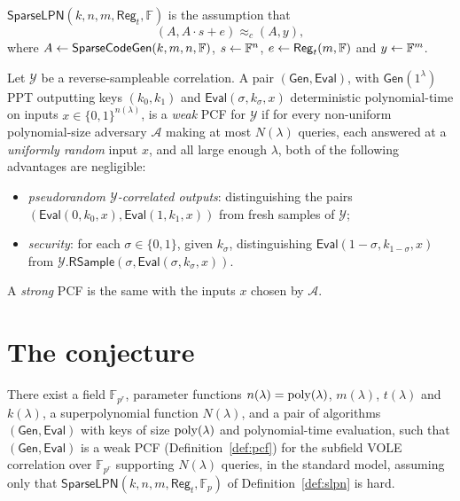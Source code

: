 \documentclass{aicr-conjecture}
\newcommand{\Adv}{\mathcal{A}}
\newcommand{\Corr}{\mathcal{Y}}
\newcommand{\F}{\mathbb{F}}
\newcommand{\Gen}{\mathsf{Gen}}
\newcommand{\Eval}{\mathsf{Eval}}
\newcommand{\SparseLPN}{\mathsf{SparseLPN}}
\newcommand{\SparseCodeGen}{\mathsf{SparseCodeGen}}
\newcommand{\Reg}{\mathsf{Reg}}
\newcommand{\bits}{\{0,1\}}
\begin{document}
\begin{definition}\label{def:slpn}
$\SparseLPN(k, n, m, \Reg_{t}, \F)$ is the assumption that
\[
  (A, A \cdot s + e) \approx_{c} (A, y),
\]
where $A \sample \SparseCodeGen(k, m, n, \F)$, $s \sample \F^{n}$,
$e \sample \Reg_{t}(m, \F)$ and $y \sample \F^{m}$.
\end{definition}

\begin{definition}\label{def:pcf}
Let $\Corr$ be a reverse-sampleable correlation. A pair $(\Gen, \Eval)$,
with $\Gen(1^{\lambda})$ PPT outputting keys $(k_{0}, k_{1})$ and
$\Eval(\sigma, k_{\sigma}, x)$ deterministic polynomial-time on inputs
$x \in \bits^{n(\lambda)}$, is a \emph{weak} PCF for $\Corr$ if for
every non-uniform polynomial-size adversary $\Adv$ making at most
$N(\lambda)$ queries, each answered at a \emph{uniformly random} input
$x$, and all large enough $\lambda$, both of the following advantages
are negligible:
\begin{itemize}[nosep]
  \item \emph{pseudorandom $\Corr$-correlated outputs}: distinguishing
    the pairs $(\Eval(0, k_{0}, x), \Eval(1, k_{1}, x))$ from fresh
    samples of $\Corr$;
  \item \emph{security}: for each $\sigma \in \bits$, given
    $k_{\sigma}$, distinguishing $\Eval(1-\sigma, k_{1-\sigma}, x)$ from
    $\Corr.\mathsf{RSample}(\sigma, \Eval(\sigma, k_{\sigma}, x))$.
\end{itemize}
A \emph{strong} PCF is the same with the inputs $x$ chosen by $\Adv$.
\end{definition}

\section{The conjecture}\label{sec:conjectures}

\begin{conjecture}\label{conj:main}
There exist a field $\F_{p^{r}}$, parameter functions
$n(\lambda) = \mathrm{poly}(\lambda)$, $m(\lambda)$, $t(\lambda)$ and
$k(\lambda)$, a superpolynomial function $N(\lambda)$, and a pair of
algorithms $(\Gen, \Eval)$ with keys of size $\mathrm{poly}(\lambda)$ and
polynomial-time evaluation, such that $(\Gen, \Eval)$ is a weak PCF
(Definition~\ref{def:pcf}) for the subfield VOLE correlation over
$\F_{p^{r}}$ supporting $N(\lambda)$ queries, in the standard model,
assuming only that $\SparseLPN(k, n, m, \Reg_{t}, \F_{p})$ of
Definition~\ref{def:slpn} is hard.
\end{conjecture}
\end{document}
